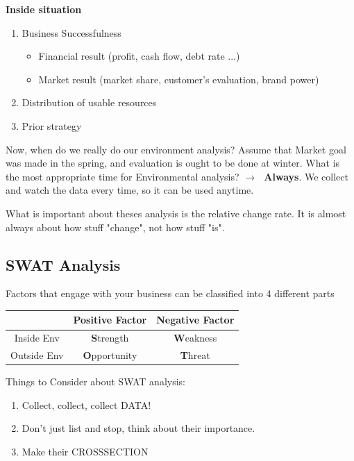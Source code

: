 \documentclass[12pt]{article}
\newcommand{\ra}{$\rightarrow \text{ }$}
\newcommand{\tb}{\textbf}
\begin{document}
\tb{Inside situation}

\begin{enumerate}
	\item Business Successfulness
	\begin{itemize}
		\item Financial result (profit, cash flow, debt rate ...)
		\item Market result (market share, customer's evaluation, brand power)
	\end{itemize}
	\item Distribution of usable resources
	\item Prior strategy
\end{enumerate}

Now, when do we really do our environment analysis? Assume that Market goal was made in the spring, and evaluation is ought to be done at winter. What is the most appropriate time for Environmental analysis? \ra \tb{Always}. We collect and watch the data every time, so it can be used anytime.

\smallskip

What is important about theses analysis is the relative change rate. It is almost always about how stuff "change", not how stuff "is".


\subsection{SWAT Analysis}

Factors that engage with your business can be classified into 4 different parts

\smallskip

\begin{tabular}{|c|c|c|}
	\hline
	 & Positive Factor & Negative Factor \\ [2ex]
	 \hline
	 Inside Env & \tb{S}trength & \tb{W}eakness \\[2ex]
	 \hline
	 Outside Env & \tb{O}pportunity & \tb{T}hreat \\ [2ex]
	 \hline

\end{tabular}

\smallskip

Things to Consider about SWAT analysis:

\begin{enumerate}
	\item Collect, collect, collect DATA!
	\item Don't just list and stop, think about their importance.
	\item Make their CROSSSECTION
\end{enumerate}
\end{document}
